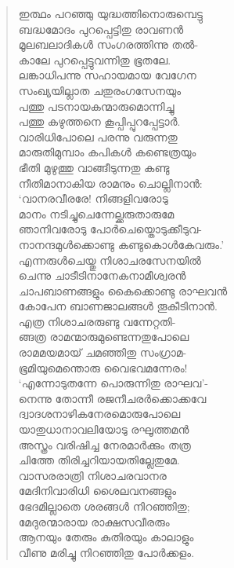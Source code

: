\begin{verse}
ഇത്ഥം പറഞ്ഞു യുദ്ധത്തിനൊരുമ്പെട്ടു\\
ബദ്ധമോദം പുറപ്പെട്ടിതു രാവണന്‍\\
മൂലബലാദികള്‍ സംഗരത്തിന്നു തല്‍-\\
കാലേ പുറപ്പെട്ടുവന്നിതു ഭൂതലേ.\\
ലങ്കാധിപന്നു സഹായമായ വേഗേന\\
സംഖ്യയില്ലാത ചതുരംഗസേനയും\\
പത്തു പടനായകന്മാരുമൊന്നിച്ചു\\
പത്തു കഴുത്തനെ കൂപ്പിപ്പുറപ്പേട്ടാര്‍.\\
വാരിധിപോലെ പരന്നു വരുന്നതു\\
മാരുതിമുമ്പാം കപികള്‍ കണ്ടെത്രയും\\
ഭീതി മുഴുത്തു വാങ്ങീടുന്നതു കണ്ടു\\
നീതിമാനാകിയ രാമനും ചൊല്ലിനാന്‍:\\
‘വാനരവീരരേ! നിങ്ങളിവരോടു\\
മാനം നടിച്ചുചെന്നേല്ക്കരുതാരുമേ\\
ഞാനിവരോടു പോര്‍ചെയ്തൊടുക്കീടുവ-\\
നാനന്ദമുള്‍ക്കൊണ്ടു കണ്ടുകൊള്‍കേവരും.’\\
എന്നരുള്‍ചെയ്തു നിശാചരസേനയില്‍\\
ചെന്നു ചാടീടിനാനേകനാമീശ്വരന്‍\\
ചാപബാണങ്ങളും കൈക്കൊണ്ടു രാഘവന്‍\\
കോപേന ബാണജാലങ്ങള്‍ തൂകീടിനാന്‍.\\
എത്ര നിശാചരരുണ്ടു വന്നേറ്റതി-\\
ങ്ങത്ര രാമന്മാരുമുണ്ടെന്നതുപോലെ\\
രാമമയമായ് ചമഞ്ഞിതു സംഗ്രാമ-\\
ഭൂമിയുമെന്തൊരു വൈഭവമന്നേരം!\\
‘എന്നോടുതന്നേ പൊരുന്നിതു രാഘവ’-\\
നെന്നു തോന്നീ രജനീചരര്‍ക്കൊക്കവേ\\
ദ്വാദശനാഴികനേരമൊരുപോലെ\\
യാതുധാനാവലിയോടു രഘൂത്തമന്‍\\
അസ്ത്രം വരിഷിച്ച നേരമാര്‍ക്കും തത്ര\\
ചിത്തേ തിരിച്ചറിയായതില്ലേതുമേ.\\
വാസരരാത്രി നിശാചരവാനര\\
മേദിനിവാരിധി ശൈലവനങ്ങളും\\
ഭേദമില്ലാതെ ശരങ്ങള്‍ നിറഞ്ഞിതു;\\
മേദുരന്മാരായ രാക്ഷസവീരരും\\
ആനയും തേരും കുതിരയും കാലാളും\\
വീണു മരിച്ചു നിറഞ്ഞിതു പോര്‍ക്കളം.\\

\end{verse}
